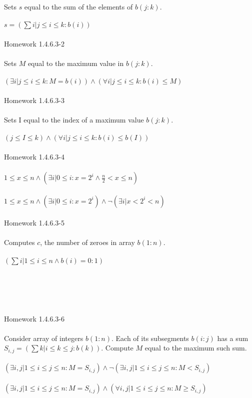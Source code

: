 \documentclass[11pt]{article}
\begin{document}
\\
\\
Sets $s$ equal to the sum of the elements of $b(j:k)$.
\\
\\
$s = (\sum i|j \leq i \leq k : b(i))$
\\
\\
Homework 1.4.6.3-2
\\
\\
Sets $M$ equal to the maximum value in $b(j:k)$.
\\
\\
$(\exists i | j \leq i \leq k : M = b(i)) \land (\forall i | j \leq i \leq k : b(i) \leq M)$
\\
\\
Homework 1.4.6.3-3
\\
\\
Sets I equal to the index of a maximum value $b(j : k)$.
\\
\\
$(j \leq I \leq k) \land (\forall i | j \leq i \leq k : b(i) \leq b(I))$
\\
\\
Homework 1.4.6.3-4
\\
\\
$1 \leq x \leq n \land (\exists i | 0 \leq i : x = 2^i \land \frac{n}{2} < x \leq n)$
\\
\\
$1 \leq x \leq n \land (\exists i | 0 \leq i : x = 2^i) \land \neg(\exists i | x < 2^i < n)$
\\
\\
Homework 1.4.6.3-5
\\
\\
Computes $c$, the number of zeroes in array $b(1:n)$.
\\
\\
$(\sum i | 1 \leq i \leq n \land b(i) = 0 : 1)$
\\
\\
\\
\\
\\
\\
Homework 1.4.6.3-6
\\
\\
Consider array of integers $b(1:n)$. Each of its subsegments $b(i : j)$ has a sum $S_{i,j} = (\sum k | i \leq k \leq j : b(k))$. Compute $M$ equal to the maximum such sum. 
\\
\\
$(\exists i, j | 1 \leq i \leq j \leq n : M = S_{i, j}) \land \neg(\exists i, j | 1 \leq i \leq j \leq n : M < S_{i, j})$
\\
\\
$(\exists i, j|1 \leq i \leq j \leq n: M = S_{i,j}) \land (\forall i, j | 1 \leq i \leq j \leq n: M \geqslant S_{i, j})$
\\
\\
\end{document}
